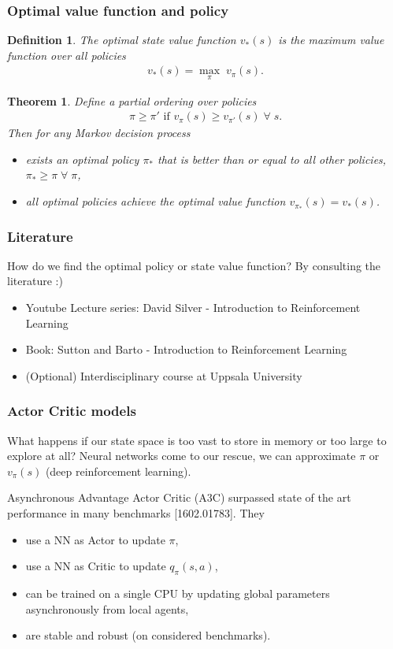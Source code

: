 \documentclass{beamer}
\newtheorem{thm}{Theorem}
\newtheorem{defn}{Definition}
\newcommand{\bi}{\begin{itemize}}
\newcommand{\ei}{\end{itemize}}
\begin{document}
\begin{frame}
\frametitle{Optimal value function and policy}
\begin{defn}
	The optimal state value function $v_*(s)$ is the maximum value function over all policies
	\begin{align}
	v_*(s) = \underset{\pi}{\max} \; v_\pi(s).
	\end{align}
\end{defn}
\begin{thm}
	Define a partial ordering over policies
	\begin{align}
		\pi \geq \pi' \text{ if } v_\pi (s) \geq v_{\pi'}(s) \; \forall \; s.
	\end{align}
	Then for any Markov decision process
	\bi
	\item exists an optimal policy $\pi_*$ that is better than or equal to all other policies, $\pi_* \geq \pi \; \forall \; \pi$,
	\item all optimal policies achieve the optimal value function $v_{\pi_*} (s) = v_* (s)$.
	\ei
\end{thm}
\end{frame}

\begin{frame}
\frametitle{Literature}
How do we find the optimal policy or state value function? By consulting the literature :)
\begin{itemize}
	\item Youtube Lecture series: David Silver - Introduction to Reinforcement Learning
	\item Book: Sutton and Barto - Introduction to Reinforcement Learning
	\item (Optional) Interdisciplinary course at Uppsala University 
\end{itemize}
\end{frame}

\begin{frame}
\frametitle{Actor Critic models}
What happens if our state space is too vast to store in memory or too large to explore at all? Neural networks come to our rescue, we can approximate $\pi$ or $v_\pi(s)$ (deep reinforcement learning).
\pause

Asynchronous Advantage Actor Critic (A3C) surpassed state of the art performance in many benchmarks {\color{blue}[1602.01783]}. They
\begin{itemize}
	\item use a NN as Actor to update $\pi$,
	\item use a NN as Critic to update $q_\pi(s,a)$,
	\item can be trained on a single CPU by updating global parameters asynchronously from local agents,
	\item are stable and robust (on considered benchmarks).
\end{itemize}
\end{frame}
\end{document}
